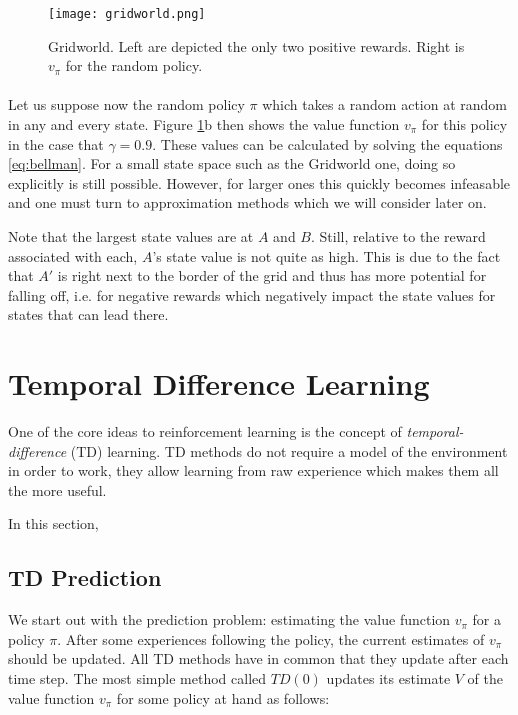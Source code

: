 \begin{figure}[htpb]
  \centering
  \texttt{[image: gridworld.png]}
  \caption[Gridworld]{
    Gridworld.
    Left are depicted the only two positive rewards.
    Right is $v_\pi$ for the random policy.
    \parencite{Sutton1998a}
  }
  \label{fig:gridworld}
\end{figure}

\paragraph{}
Let us suppose now the random policy $\pi$
which takes a random action at random in any and every state.
Figure \ref{fig:gridworld}b then shows the value function $v_\pi$
for this policy in the case that $\gamma=0.9$.
These values can be calculated by solving the equations \ref{eq:bellman}.
For a small state space such as the Gridworld one, doing so explicitly
is still possible.
However, for larger ones this quickly becomes infeasable
and one must turn to approximation methods
which we will consider later on.

Note that the largest state values are at $A$ and $B$.
Still, relative to the reward associated with each,
$A$'s state value is not quite as high.
This is due to the fact that $A'$
is right next to the border of the grid
and thus has more potential for falling off,
i.e. for negative rewards which negatively impact
the state values for states that can lead there.

\section{Temporal Difference Learning}

One of the core ideas to reinforcement learning
is the concept of \textit{temporal-difference} (TD) learning.
TD methods do not require a model of the environment
in order to work,
they allow learning from raw experience
which makes them all the more useful.

In this section,

\subsection{TD Prediction}
We start out with the prediction problem:
estimating the value function $v_\pi$ for a policy $\pi$.
After some experiences following the policy,
the current estimates of $v_\pi$ should be updated.
All TD methods have in common that they update after each time step.
The most simple method called $TD(0)$
updates its estimate $V$ of the value function $v_\pi$
for some policy at hand as follows:

